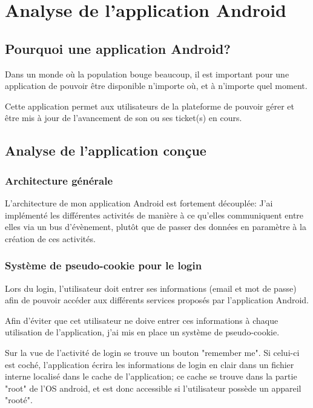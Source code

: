 \documentclass[12pt,table,a4paper]{report}
\begin{document}
\section{Analyse de l'application Android}

\subsection{Pourquoi une application Android?}
Dans un monde où la population bouge beaucoup, il est important pour une application de pouvoir être disponible n'importe où, et à n'importe quel moment.

Cette application permet aux utilisateurs de la plateforme de pouvoir gérer et être mis à jour de l'avancement de son ou ses ticket(s) en cours.



\subsection{Analyse de l'application conçue}

\subsubsection{Architecture générale}
L'architecture de mon application Android est fortement découplée: J'ai implémenté les différentes activités de manière à ce qu'elles communiquent entre elles via un bus d'évènement, plutôt que de passer des données en paramètre à la création de ces activités.


\subsubsection{Système de pseudo-cookie pour le login}
Lors du login, l'utilisateur doit entrer ses informations (email et mot de passe) afin de pouvoir accéder aux différents services proposés par l'application Android.

Afin d'éviter que cet utilisateur ne doive entrer ces informations à chaque utilisation de l'application, j'ai mis en place un système de pseudo-cookie.

Sur la vue de l'activité de login se trouve un bouton "remember me". Si celui-ci est coché, l'application écrira les informations de login en clair dans un fichier interne localisé dans le cache de l'application; ce cache se trouve dans la partie "root" de l'OS android, et est donc accessible si l'utilisateur possède un appareil "rooté".
\end{document}
